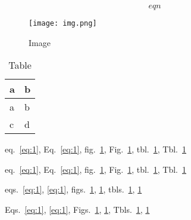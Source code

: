 \begin{equation}eqn\label{eq:1}\end{equation}

\begin{figure}
\hypertarget{fig:1}{%
\centering
\texttt{[image: img.png]}
\caption{Image}\label{fig:1}
}
\end{figure}

\hypertarget{tbl:1}{}
\begin{longtable}[]{@{}ll@{}}
\caption{\label{tbl:1}Table}\tabularnewline
\toprule
a & b\tabularnewline
\midrule
\endfirsthead
\toprule
a & b\tabularnewline
\midrule
\endhead
c & d\tabularnewline
\bottomrule
\end{longtable}

eq.~\ref{eq:1}, Eq.~\ref{eq:1}, fig.~\ref{fig:1}, Fig.~\ref{fig:1},
tbl.~\ref{tbl:1}, Tbl.~\ref{tbl:1}

eq.~\ref{eq:1}, Eq.~\ref{eq:1}, fig.~\ref{fig:1}, Fig.~\ref{fig:1},
tbl.~\ref{tbl:1}, Tbl.~\ref{tbl:1}

eqs.~\ref{eq:1}, \ref{eq:1}, figs.~\ref{fig:1}, \ref{fig:1},
tbls.~\ref{tbl:1}, \ref{tbl:1}

Eqs.~\ref{eq:1}, \ref{eq:1}, Figs.~\ref{fig:1}, \ref{fig:1},
Tbls.~\ref{tbl:1}, \ref{tbl:1}
